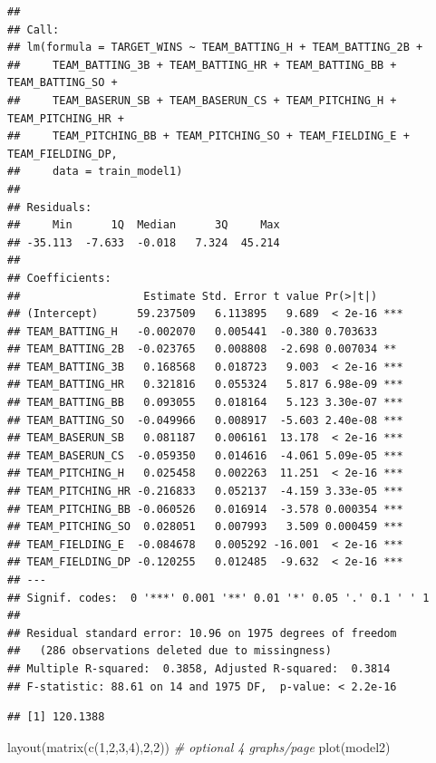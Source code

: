 \documentclass[
]{article}
\newenvironment{Shaded}{\begin{snugshade}}{\end{snugshade}}
\newcommand{\CommentTok}[1]{\textcolor[rgb]{0.56,0.35,0.01}{\textit{#1}}}
\newcommand{\DecValTok}[1]{\textcolor[rgb]{0.00,0.00,0.81}{#1}}
\newcommand{\FunctionTok}[1]{\textcolor[rgb]{0.00,0.00,0.00}{#1}}
\newcommand{\NormalTok}[1]{#1}
\newcommand{\SpecialCharTok}[1]{\textcolor[rgb]{0.00,0.00,0.00}{#1}}
\begin{document}
\begin{verbatim}
## 
## Call:
## lm(formula = TARGET_WINS ~ TEAM_BATTING_H + TEAM_BATTING_2B + 
##     TEAM_BATTING_3B + TEAM_BATTING_HR + TEAM_BATTING_BB + TEAM_BATTING_SO + 
##     TEAM_BASERUN_SB + TEAM_BASERUN_CS + TEAM_PITCHING_H + TEAM_PITCHING_HR + 
##     TEAM_PITCHING_BB + TEAM_PITCHING_SO + TEAM_FIELDING_E + TEAM_FIELDING_DP, 
##     data = train_model1)
## 
## Residuals:
##     Min      1Q  Median      3Q     Max 
## -35.113  -7.633  -0.018   7.324  45.214 
## 
## Coefficients:
##                   Estimate Std. Error t value Pr(>|t|)    
## (Intercept)      59.237509   6.113895   9.689  < 2e-16 ***
## TEAM_BATTING_H   -0.002070   0.005441  -0.380 0.703633    
## TEAM_BATTING_2B  -0.023765   0.008808  -2.698 0.007034 ** 
## TEAM_BATTING_3B   0.168568   0.018723   9.003  < 2e-16 ***
## TEAM_BATTING_HR   0.321816   0.055324   5.817 6.98e-09 ***
## TEAM_BATTING_BB   0.093055   0.018164   5.123 3.30e-07 ***
## TEAM_BATTING_SO  -0.049966   0.008917  -5.603 2.40e-08 ***
## TEAM_BASERUN_SB   0.081187   0.006161  13.178  < 2e-16 ***
## TEAM_BASERUN_CS  -0.059350   0.014616  -4.061 5.09e-05 ***
## TEAM_PITCHING_H   0.025458   0.002263  11.251  < 2e-16 ***
## TEAM_PITCHING_HR -0.216833   0.052137  -4.159 3.33e-05 ***
## TEAM_PITCHING_BB -0.060526   0.016914  -3.578 0.000354 ***
## TEAM_PITCHING_SO  0.028051   0.007993   3.509 0.000459 ***
## TEAM_FIELDING_E  -0.084678   0.005292 -16.001  < 2e-16 ***
## TEAM_FIELDING_DP -0.120255   0.012485  -9.632  < 2e-16 ***
## ---
## Signif. codes:  0 '***' 0.001 '**' 0.01 '*' 0.05 '.' 0.1 ' ' 1
## 
## Residual standard error: 10.96 on 1975 degrees of freedom
##   (286 observations deleted due to missingness)
## Multiple R-squared:  0.3858, Adjusted R-squared:  0.3814 
## F-statistic: 88.61 on 14 and 1975 DF,  p-value: < 2.2e-16
\end{verbatim}

\begin{Shaded}
\end{Shaded}

\begin{verbatim}
## [1] 120.1388
\end{verbatim}

\begin{Shaded}
\begin{Highlighting}[]
\FunctionTok{layout}\NormalTok{(}\FunctionTok{matrix}\NormalTok{(}\FunctionTok{c}\NormalTok{(}\DecValTok{1}\NormalTok{,}\DecValTok{2}\NormalTok{,}\DecValTok{3}\NormalTok{,}\DecValTok{4}\NormalTok{),}\DecValTok{2}\NormalTok{,}\DecValTok{2}\NormalTok{)) }\CommentTok{\# optional 4 graphs/page}
\FunctionTok{plot}\NormalTok{(model2)}
\end{Highlighting}
\end{Shaded}
\end{document}
